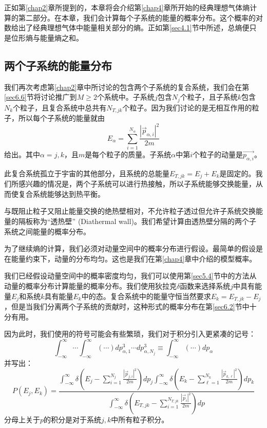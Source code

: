 \documentclass[UTF8]{ctexart}
\numberwithin{equation}{section}%
\numberwithin{figure}{section}%
\begin{document}
    正如第\ref{chap2}章所提到的，本章将会介绍第\ref{chap4}章所开始的经典理想气体熵计算的第二部分。在本章，我们会计算每个子系统的能量的概率分布。这个概率的对数给出了经典理想气体中能量相关部分的熵。正如第\ref{sec4.1}节中所述，总熵便只是位形熵与能量熵之和。
    \subsection{两个子系统的能量分布}
    我们再次考虑第\ref{chap2}章中所讨论的包含两个子系统的复合系统，我们会在第\ref{sec6.6}节将讨论推广到$M\geq2$个系统中。子系统$j$包含$N_j$个粒子，且子系统$k$包含$N_k$个粒子，且复合系统中总共有$N_{T,jk}$个粒子。因为我们讨论的是无相互作用的粒子，所以每个子系统的能量就由
    \begin{equation}
        E_{\alpha}=\sum_{i=1}^{N_{\alpha}} \frac{\left|\vec{p}_{\alpha, i}\right|^{2}}{2 m}
    \end{equation}
    给出。其中$\alpha=j,k$，且$m$是每个粒子的质量。子系统$\alpha$中第$i$个粒子的动量是$\vec{p_{\alpha,i}}$。

    此复合系统孤立于宇宙的其他部分，且系统的总能量$E_{T,jk}=E_j+E_k$是固定的。我们所感兴趣的情况是，两个子系统可以进行热接触，所以子系统能够交换能量，从而使复合系统能够达到热平衡。

    与既阻止粒子又阻止能量交换的绝热壁相对，不允许粒子透过但允许子系统交换能量的隔板称为“透热壁” (Diathermal wall)。我们希望计算由透热壁分隔的两个子系统之间能量的概率分布。

    为了继续熵的计算，我们必须对动量空间中的概率分布进行假设。最简单的假设是在能量约束下，动量的分布均匀。这也是我们在第\ref{chap4}章中介绍的模型概率。

    我们已经假设动量空间中的概率密度均匀，我们可以使用第\ref{sec5.4}节中的方法从动量的概率分布计算能量的概率分布。我们使用狄拉克$\delta$函数来选择系统$j$中具有能量$E_j$和系统$k$具有能量$E_k$中的态。复合系统中的能量守恒当然要求$E_k=E_{T,jk}-E_j$，但是当我们分离两个子系统的贡献时，这种形式的概率分布在第\ref{sec6.2}节中十分有用。

    因为此时，我们使用的符号可能会有些繁琐，我们对于积分引入更紧凑的记号：
    \begin{equation}
        \int_{-\infty}^{\infty} \cdots \int_{-\infty}^{\infty}(\cdots) d p_{\alpha, 1}^{3} \cdots d p_{\alpha, N_{j}}^{3} \equiv \int_{-\infty}^{\infty}(\cdots) d p_{\alpha}
    \end{equation}
    并写出：
    \begin{equation}\label{eq6.3}
        P\left(E_{j}, E_{k}\right)=\frac{\int_{-\infty}^{\infty} \delta\left(E_{j}-\sum_{i=1}^{N_{j}} \frac{\left|\vec{p}_{j, i}\right|^{2}}{2 m}\right) d p_{j} \int_{-\infty}^{\infty} \delta\left(E_{k}-\sum_{\ell=1}^{N_{k}} \frac{\left|\vec{p}_{k, \ell}\right|^{2}}{2 m}\right) d p_{k}}{\int_{-\infty}^{\infty} \delta\left(E_{T, j k}-\sum_{i=1}^{N_{T, j k}} \frac{\left|\vec{p}_{i}\right|^{2}}{2 m}\right) d p}
    \end{equation}
    分母上关于$p$的积分是对于系统$j,k$中所有粒子积分。
\end{document}
